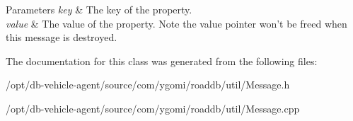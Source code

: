 \begin{DoxyParams}{Parameters}
{\em key} & The key of the property. \\
\hline
{\em value} & The value of the property. Note the value pointer won't be freed when this message is destroyed. \\
\hline
\end{DoxyParams}


The documentation for this class was generated from the following files\-:\begin{DoxyCompactItemize}
\item 
/opt/db-\/vehicle-\/agent/source/com/ygomi/roaddb/util/Message.\-h\item 
/opt/db-\/vehicle-\/agent/source/com/ygomi/roaddb/util/Message.\-cpp\end{DoxyCompactItemize}
